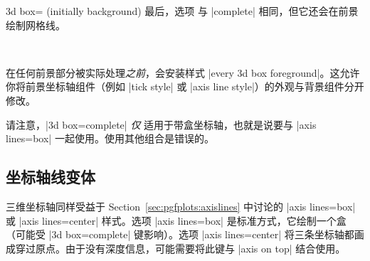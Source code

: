 {\begin{pgfplotskey}{3d box= (initially background)}
    最后，选项  与 |complete| 相同，但它还会在前景绘制网格线。
\begin{codeexample}[]
%
~
\end{codeexample}

    在任何前景部分被实际处理\emph{之前}，会安装样式 |every 3d box foreground|。这允许你将前景坐标轴组件（例如 |tick style| 或 |axis line style|）的外观与背景组件分开修改。

    请注意，|3d box=complete| \emph{仅} 适用于带盒坐标轴，也就是说要与 |axis lines=box| 一起使用。使用其他组合是错误的。
\end{pgfplotskey}


\subsection{坐标轴线变体}
\label{sec:pgfplots:axislines:3d}

三维坐标轴同样受益于 Section~\ref{sec:pgfplots:axislines} 中讨论的 |axis lines=box| 或 |axis lines=center| 样式。选项 |axis lines=box| 是标准方式，它绘制一个盒（可能受 |3d box=complete| 键影响）。选项 |axis lines=center| 将三条坐标轴都画成穿过原点。由于没有深度信息，可能需要将此键与 |axis on top| 结合使用。

\begin{codeexample}[]
\end{codeexample}

}
